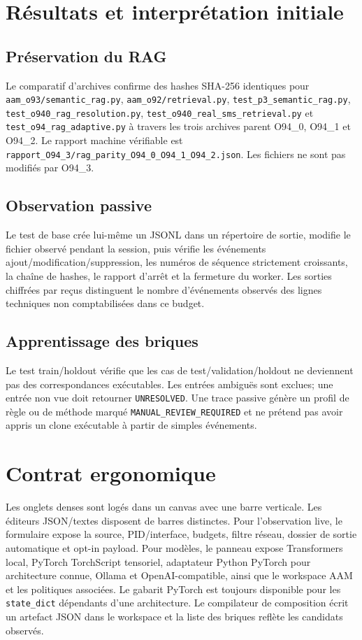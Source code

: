 \documentclass[11pt,a4paper]{article}
\begin{document}
\section{Résultats et interprétation initiale}
\subsection{Préservation du RAG}
Le comparatif d'archives confirme des hashes SHA-256 identiques pour \texttt{aam\_o93/semantic\_rag.py}, \texttt{aam\_o92/retrieval.py}, \texttt{test\_p3\_semantic\_rag.py}, \texttt{test\_o940\_rag\_resolution.py}, \texttt{test\_o940\_real\_sms\_retrieval.py} et \texttt{test\_o94\_rag\_adaptive.py} à travers les trois archives parent O94\_0, O94\_1 et O94\_2. Le rapport machine vérifiable est \texttt{rapport\_O94\_3/rag\_parity\_O94\_0\_O94\_1\_O94\_2.json}. Les fichiers ne sont pas modifiés par O94\_3.

\subsection{Observation passive}
Le test de base crée lui-même un JSONL dans un répertoire de sortie, modifie le fichier observé pendant la session, puis vérifie les événements ajout/modification/suppression, les numéros de séquence strictement croissants, la chaîne de hashes, le rapport d'arrêt et la fermeture du worker. Les sorties chiffrées par reçus distinguent le nombre d'événements observés des lignes techniques non comptabilisées dans ce budget.

\subsection{Apprentissage des briques}
Le test train/holdout vérifie que les cas de test/validation/holdout ne deviennent pas des correspondances exécutables. Les entrées ambiguës sont exclues; une entrée non vue doit retourner \texttt{UNRESOLVED}. Une trace passive génère un profil de règle ou de méthode marqué \texttt{MANUAL\_REVIEW\_REQUIRED} et ne prétend pas avoir appris un clone exécutable à partir de simples événements.

\section{Contrat ergonomique}
Les onglets denses sont logés dans un canvas avec une barre verticale. Les éditeurs JSON/textes disposent de barres distinctes. Pour l'observation live, le formulaire expose la source, PID/interface, budgets, filtre réseau, dossier de sortie automatique et opt-in payload. Pour modèles, le panneau expose Transformers local, PyTorch TorchScript tensoriel, adaptateur Python PyTorch pour architecture connue, Ollama et OpenAI-compatible, ainsi que le workspace AAM et les politiques associées. Le gabarit PyTorch est toujours disponible pour les \texttt{state\_dict} dépendants d'une architecture. Le compilateur de composition écrit un artefact JSON dans le workspace et la liste des briques reflète les candidats observés.
\end{document}
